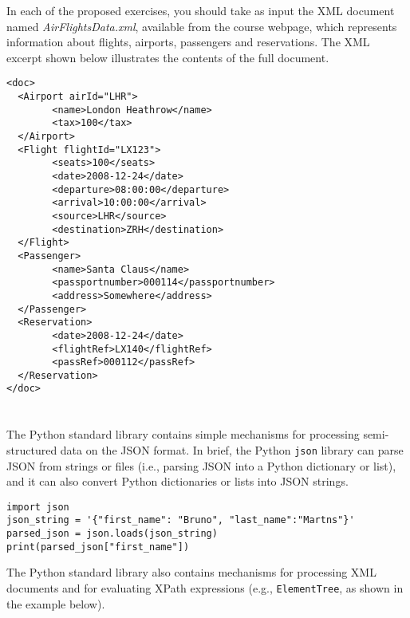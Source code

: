 \documentclass[12pt]{article}
\begin{document}

In each of the proposed exercises, you should take as input the XML document named {\it AirFlightsData.xml}, available from the course webpage, which represents information about flights, airports, passengers and reservations. The XML excerpt shown below illustrates the contents of the full document.

\begin{verbatim}
<doc>
  <Airport airId="LHR">
        <name>London Heathrow</name>
        <tax>100</tax>
  </Airport>
  <Flight flightId="LX123">
        <seats>100</seats>
        <date>2008-12-24</date>
        <departure>08:00:00</departure>
        <arrival>10:00:00</arrival>
        <source>LHR</source>
        <destination>ZRH</destination>
  </Flight>
  <Passenger>
        <name>Santa Claus</name>
        <passportnumber>000114</passportnumber>
        <address>Somewhere</address>        
  </Passenger>
  <Reservation>
        <date>2008-12-24</date>
        <flightRef>LX140</flightRef>
        <passRef>000112</passRef>
  </Reservation>
</doc>

\end{verbatim}

\section{}

The Python standard library contains simple mechanisms for processing semi-structured data on the JSON format. In brief, the Python {\tt json} library can parse JSON from strings or files (i.e., parsing JSON into a Python dictionary or list), and it can also convert Python dictionaries or lists into JSON strings.

\begin{verbatim}
import json
json_string = '{"first_name": "Bruno", "last_name":"Martns"}'
parsed_json = json.loads(json_string)
print(parsed_json["first_name"])
\end{verbatim}

The Python standard library also contains mechanisms for processing XML documents and for evaluating XPath expressions (e.g., {\tt ElementTree}, as shown in the example below). %
\end{document}
